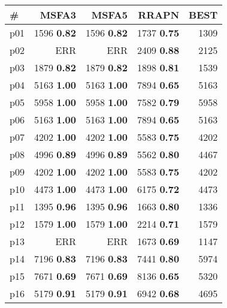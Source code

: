 \begin{tabular}{|l|rrr|r|}
\hline
\textbf{\#} & \textbf{MSFA3} & \textbf{MSFA5} & \textbf{RRAPN} & \textbf{BEST}\\
\hline
p01 & {\footnotesize 1596} \textbf{0.82} & {\footnotesize 1596} \textbf{0.82} & {\footnotesize 1737} \textbf{0.75} & 1309\\
p02 & ERR & ERR & {\footnotesize 2409} \textbf{0.88} & 2125\\
p03 & {\footnotesize 1879} \textbf{0.82} & {\footnotesize 1879} \textbf{0.82} & {\footnotesize 1898} \textbf{0.81} & 1539\\
p04 & {\footnotesize 5163} \textbf{1.00} & {\footnotesize 5163} \textbf{1.00} & {\footnotesize 7894} \textbf{0.65} & 5163\\
p05 & {\footnotesize 5958} \textbf{1.00} & {\footnotesize 5958} \textbf{1.00} & {\footnotesize 7582} \textbf{0.79} & 5958\\
p06 & {\footnotesize 5163} \textbf{1.00} & {\footnotesize 5163} \textbf{1.00} & {\footnotesize 7894} \textbf{0.65} & 5163\\
p07 & {\footnotesize 4202} \textbf{1.00} & {\footnotesize 4202} \textbf{1.00} & {\footnotesize 5583} \textbf{0.75} & 4202\\
p08 & {\footnotesize 4996} \textbf{0.89} & {\footnotesize 4996} \textbf{0.89} & {\footnotesize 5562} \textbf{0.80} & 4467\\
p09 & {\footnotesize 4202} \textbf{1.00} & {\footnotesize 4202} \textbf{1.00} & {\footnotesize 5583} \textbf{0.75} & 4202\\
p10 & {\footnotesize 4473} \textbf{1.00} & {\footnotesize 4473} \textbf{1.00} & {\footnotesize 6175} \textbf{0.72} & 4473\\
p11 & {\footnotesize 1395} \textbf{0.96} & {\footnotesize 1395} \textbf{0.96} & {\footnotesize 1663} \textbf{0.80} & 1336\\
p12 & {\footnotesize 1579} \textbf{1.00} & {\footnotesize 1579} \textbf{1.00} & {\footnotesize 2214} \textbf{0.71} & 1579\\
p13 & ERR & ERR & {\footnotesize 1673} \textbf{0.69} & 1147\\
p14 & {\footnotesize 7196} \textbf{0.83} & {\footnotesize 7196} \textbf{0.83} & {\footnotesize 7441} \textbf{0.80} & 5974\\
p15 & {\footnotesize 7671} \textbf{0.69} & {\footnotesize 7671} \textbf{0.69} & {\footnotesize 8136} \textbf{0.65} & 5320\\
p16 & {\footnotesize 5179} \textbf{0.91} & {\footnotesize 5179} \textbf{0.91} & {\footnotesize 6942} \textbf{0.68} & 4695\\

\end{tabular}
